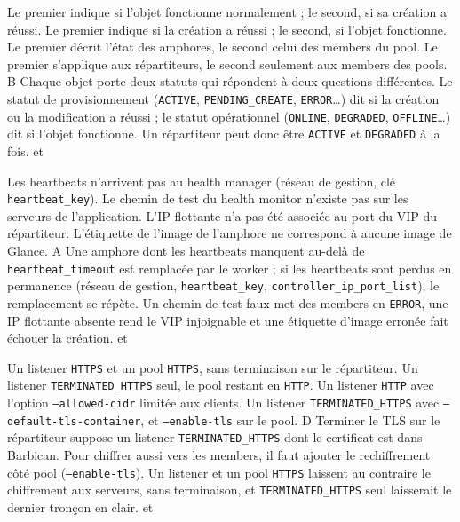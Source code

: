   {Le premier indique si l'objet fonctionne normalement ; le second, si sa création a réussi.}
  {Le premier indique si la création a réussi ; le second, si l'objet fonctionne.}
  {Le premier décrit l'état des amphores, le second celui des members du pool.}
  {Le premier s'applique aux répartiteurs, le second seulement aux members des pools.}
  {B}
  {Chaque objet porte deux statuts qui répondent à deux questions différentes. Le statut de provisionnement (\texttt{ACTIVE}, \texttt{PENDING\_CREATE}, \texttt{ERROR}\dots) dit si la création ou la modification a réussi ; le statut opérationnel (\texttt{ONLINE}, \texttt{DEGRADED}, \texttt{OFFLINE}\dots) dit si l'objet fonctionne. Un répartiteur peut donc être \texttt{ACTIVE} et \texttt{DEGRADED} à la fois.}
  { et }

  {Les heartbeats n'arrivent pas au health manager (réseau de gestion, clé \texttt{heartbeat\_key}).}
  {Le chemin de test du health monitor n'existe pas sur les serveurs de l'application.}
  {L'IP flottante n'a pas été associée au port du VIP du répartiteur.}
  {L'étiquette de l'image de l'amphore ne correspond à aucune image de Glance.}
  {A}
  {Une amphore dont les heartbeats manquent au-delà de \texttt{heartbeat\_timeout} est remplacée par le worker ; si les heartbeats sont perdus en permanence (réseau de gestion, \texttt{heartbeat\_key}, \texttt{controller\_ip\_port\_list}), le remplacement se répète. Un chemin de test faux met des members en \texttt{ERROR}, une IP flottante absente rend le VIP injoignable et une étiquette d'image erronée fait échouer la création.}
  { et }

  {Un listener \texttt{HTTPS} et un pool \texttt{HTTPS}, sans terminaison sur le répartiteur.}
  {Un listener \texttt{TERMINATED\_HTTPS} seul, le pool restant en \texttt{HTTP}.}
  {Un listener \texttt{HTTP} avec l'option \texttt{--allowed-cidr} limitée aux clients.}
  {Un listener \texttt{TERMINATED\_HTTPS} avec \texttt{--default-tls-container}, et \texttt{--enable-tls} sur le pool.}
  {D}
  {Terminer le TLS sur le répartiteur suppose un listener \texttt{TERMINATED\_HTTPS} dont le certificat est dans Barbican. Pour chiffrer aussi vers les members, il faut ajouter le rechiffrement côté pool (\texttt{--enable-tls}). Un listener et un pool \texttt{HTTPS} laissent au contraire le chiffrement aux serveurs, sans terminaison, et \texttt{TERMINATED\_HTTPS} seul laisserait le dernier tronçon en clair.}
  { et }

